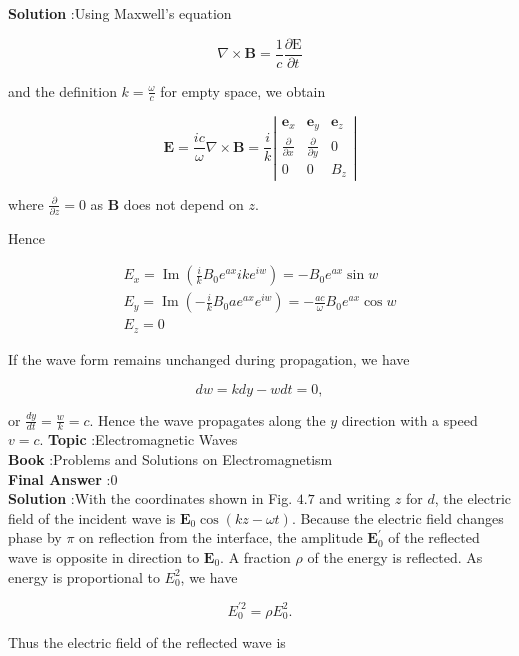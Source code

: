 \documentclass[10pt]{article}
\begin{document}
\textbf{Solution} :Using Maxwell's equation

$$
\nabla \times \mathbf{B}=\frac{1}{c} \frac{\partial \mathrm{E}}{\partial t}
$$

and the definition $k=\frac{\omega}{c}$ for empty space, we obtain

$$
\mathbf{E}=\frac{i c}{\omega} \nabla \times \mathbf{B}=\frac{i}{k}\left|\begin{array}{ccc}
\mathbf{e}_{x} & \mathbf{e}_{y} & \mathbf{e}_{z} \\
\frac{\partial}{\partial x} & \frac{\partial}{\partial y} & 0 \\
0 & 0 & B_{z}
\end{array}\right|
$$

where $\frac{\partial}{\partial z}=0$ as $\mathbf{B}$ does not depend on $z$.

Hence

$$
\begin{gathered}
E_{x}=\operatorname{Im}\left(\frac{i}{k} B_{0} e^{a x} i k e^{i w}\right)=-B_{0} e^{a x} \sin w \\
E_{y}=\operatorname{Im}\left(-\frac{i}{k} B_{0} a e^{a x} e^{i w}\right)=-\frac{a c}{\omega} B_{0} e^{a x} \cos w \\
E_{z}=0
\end{gathered}
$$

 If the wave form remains unchanged during propagation, we have

$$
d w=k d y-w d t=0,
$$

or $\frac{d y}{d t}=\frac{w}{k}=c$. Hence the wave propagates along the $y$ direction with a speed $v=c$.
\textbf{Topic} :Electromagnetic Waves\\
\textbf{Book} :Problems and Solutions on Electromagnetism\\
\textbf{Final Answer} :0\\


\textbf{Solution} :With the coordinates shown in Fig. $4.7$ and writing $z$ for $d$, the electric field of the incident wave is $\mathbf{E}_{0} \cos (k z-\omega t)$. Because the electric field changes phase by $\pi$ on reflection from the interface, the amplitude $\mathbf{E}_{0}^{\prime}$ of the reflected wave is opposite in direction to $\mathbf{E}_{0}$. A fraction $\rho$ of the energy is reflected. As energy is proportional to $E_{0}^{2}$, we have

$$
E_{0}^{\prime 2}=\rho E_{0}^{2} .
$$

Thus the electric field of the reflected wave is
\end{document}
